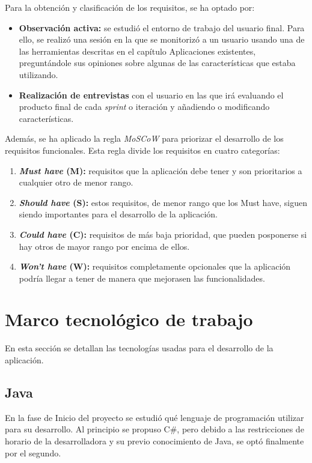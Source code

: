 Para la obtención y clasificación de los requisitos, se ha optado por:
\begin{itemize}
	\item \textbf{Observación activa:} se estudió el entorno de trabajo del usuario final. Para ello, se realizó una sesión en la que se monitorizó a un usuario usando una de las herramientas descritas en el capítulo Aplicaciones existentes, preguntándole sus opiniones sobre algunas de las características que estaba utilizando.
	\item \textbf{Realización de entrevistas} con el usuario en las que irá evaluando el producto final de cada \textit{sprint} o iteración y añadiendo o modificando características.
\end{itemize}

Además, se ha aplicado la regla \textit{MoSCoW} para priorizar el desarrollo de los requisitos funcionales. Esta regla divide los requisitos en cuatro categorías:
\begin{enumerate}
	\item \textbf{\textit{Must have} (M):} requisitos que la aplicación debe tener y son prioritarios a cualquier otro de menor rango.	
	\item \textbf{\textit{Should have} (S):} estos requisitos, de menor rango que los Must have, siguen siendo importantes para el desarrollo de la aplicación.	
	\item \textbf{\textit{Could have} (C):} requisitos de más baja prioridad, que pueden posponerse si hay otros de mayor rango por encima de ellos.	
	\item \textbf{\textit{Won't have} (W):} requisitos completamente opcionales que la aplicación podría llegar a tener de manera que mejorasen las funcionalidades.
	
\end{enumerate}



\section{Marco tecnológico de trabajo}

En esta sección se detallan las tecnologías usadas para el desarrollo de la aplicación.

\subsection{Java}
En la fase de Inicio del proyecto se estudió qué lenguaje de programación utilizar para su desarrollo. Al principio se propuso C\#, pero debido a las restricciones de horario de la desarrolladora y su previo conocimiento de Java\cite{java}, se optó finalmente por el segundo.

